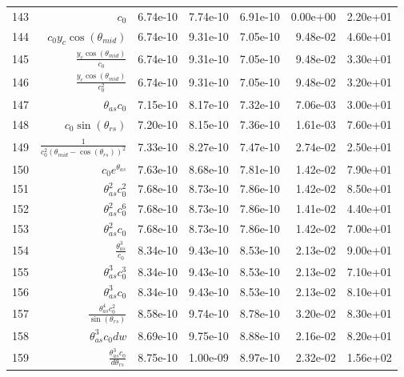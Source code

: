 \begin{tabularx}{\textwidth}{lRRRRRl}
143  &  $ c_{0} $  &  6.74e-10  &  7.74e-10  &  6.91e-10  &  0.00e+00  &  2.20e+01  \\ 
144  &  $ c_{0} y_c \cos{\left(\theta_{mid} \right)} $  &  6.74e-10  &  9.31e-10  &  7.05e-10  &  9.48e-02  &  4.60e+01  \\ 
145  &  $ \displaystyle\frac{y_c \cos{\left(\theta_{mid} \right)}}{c_{0}} $  &  6.74e-10  &  9.31e-10  &  7.05e-10  &  9.48e-02  &  3.30e+01  \\ 
146  &  $ \displaystyle\frac{y_c \cos{\left(\theta_{mid} \right)}}{c_{0}^{2}} $  &  6.74e-10  &  9.31e-10  &  7.05e-10  &  9.48e-02  &  3.20e+01  \\ 
147  &  $ \theta_{as} c_{0} $  &  7.15e-10  &  8.17e-10  &  7.32e-10  &  7.06e-03  &  3.00e+01  \\ 
148  &  $ c_{0} \sin{\left(\theta_{rs} \right)} $  &  7.20e-10  &  8.15e-10  &  7.36e-10  &  1.61e-03  &  7.60e+01  \\ 
149  &  $ \displaystyle\frac{1}{c_{0}^{2} \left(\theta_{mid} - \cos{\left(\theta_{rs} \right)}\right)^{2}} $  &  7.33e-10  &  8.27e-10  &  7.47e-10  &  2.74e-02  &  2.50e+01  \\ 
150  &  $ c_{0} e^{\theta_{as}} $  &  7.63e-10  &  8.68e-10  &  7.81e-10  &  1.42e-02  &  7.90e+01  \\ 
151  &  $ \theta_{as}^{2} c_{0}^{2} $  &  7.68e-10  &  8.73e-10  &  7.86e-10  &  1.42e-02  &  8.50e+01  \\ 
152  &  $ \theta_{as}^{2} c_{0}^{6} $  &  7.68e-10  &  8.73e-10  &  7.86e-10  &  1.41e-02  &  4.40e+01  \\ 
153  &  $ \theta_{as}^{2} c_{0} $  &  7.68e-10  &  8.73e-10  &  7.86e-10  &  1.42e-02  &  7.00e+01  \\ 
154  &  $ \displaystyle\frac{\theta_{as}^{3}}{c_{0}} $  &  8.34e-10  &  9.43e-10  &  8.53e-10  &  2.13e-02  &  9.00e+01  \\ 
155  &  $ \theta_{as}^{3} c_{0}^{3} $  &  8.34e-10  &  9.43e-10  &  8.53e-10  &  2.13e-02  &  7.10e+01  \\ 
156  &  $ \theta_{as}^{3} c_{0} $  &  8.34e-10  &  9.43e-10  &  8.53e-10  &  2.13e-02  &  8.10e+01  \\ 
157  &  $ \displaystyle\frac{\theta_{as}^{4} c_{0}^{2}}{\sin{\left(\theta_{rs} \right)}} $  &  8.58e-10  &  9.74e-10  &  8.78e-10  &  3.20e-02  &  8.30e+01  \\ 
158  &  $ \theta_{as}^{3} c_{0} d w $  &  8.69e-10  &  9.75e-10  &  8.88e-10  &  2.16e-02  &  8.20e+01  \\ 
159  &  $ \displaystyle\frac{\theta_{as}^{3} c_{0}}{d \theta_{rs}} $  &  8.75e-10  &  1.00e-09  &  8.97e-10  &  2.32e-02  &  1.56e+02  \\ 

\end{tabularx}
